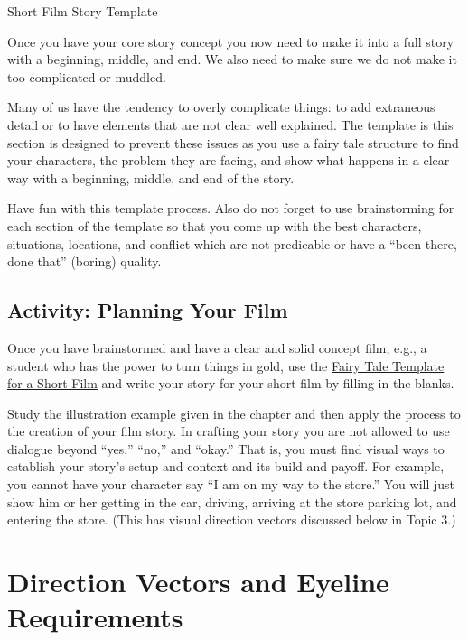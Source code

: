 \documentclass[
]{book}
\begin{document}
{Short Film Story Template}

Once you have your core story concept you now need to make it into a full story with a beginning, middle, and end. We also need to make sure we do not make it too complicated or muddled.

Many of us have the tendency to overly complicate things: to add extraneous detail or to have elements that are not clear well explained. The template is this section is designed to prevent these issues as you use a fairy tale structure to find your characters, the problem they are facing, and show what happens in a clear way with a beginning, middle, and end of the story.

Have fun with this template process. Also do not forget to use brainstorming for each section of the template so that you come up with the best characters, situations, locations, and conflict which are not predicable or have a ``been there, done that'' (boring) quality.

\hypertarget{activity-planning-your-film}{%
\subsection*{Activity: Planning Your Film}\label{activity-planning-your-film}}

\begin{reflect}
Once you have brainstormed and have a clear and solid concept film, e.g., a student who has the power to turn things in gold, use the \href{assets/unit6/Fairy_Tale_Template_for_a_Short_Film.pdf}{Fairy Tale Template for a Short Film} and write your story for your short film by filling in the blanks.

Study the illustration example given in the chapter and then apply the process to the creation of your film story. In crafting your story you are not allowed to use dialogue beyond ``yes,'' ``no,'' and ``okay.'' That is, you must find visual ways to establish your story's setup and context and its build and payoff. For example, you cannot have your character say ``I am on my way to the store.'' You will just show him or her getting in the car, driving, arriving at the store parking lot, and entering the store. (This has visual direction vectors discussed below in Topic 3.)
\end{reflect}

\hypertarget{direction-vectors-and-eyeline-requirements}{%
\section{Direction Vectors and Eyeline Requirements}\label{direction-vectors-and-eyeline-requirements}}
\end{document}
